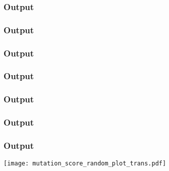   \begin{frame}
    \frametitle{Output}
    \centering
    
  \end{frame}

  \begin{frame}
    \frametitle{Output}
    \centering
    
  \end{frame}

  \begin{frame}
    \frametitle{Output}
    \centering
    
  \end{frame}

  \begin{frame}
    \frametitle{Output}
    \centering
    
  \end{frame}

  \begin{frame}
    \frametitle{Output}
    \centering
    
  \end{frame}

  \begin{frame}
    \frametitle{Output}
    \centering
    
  \end{frame}

  \begin{frame}
    \frametitle{Output}
    \centering
    \texttt{[image: mutation\_score\_random\_plot\_trans.pdf]}
  \end{frame}
